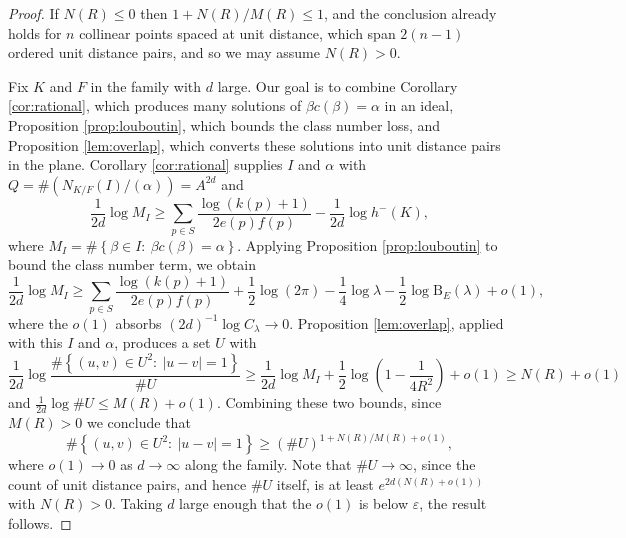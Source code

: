 \begin{proof}
If $N(R)\leq0$ then $1+N(R)/M(R)\leq1$, and the conclusion already holds for $n$ collinear points spaced at unit distance, which span $2(n-1)$ ordered unit distance pairs, and so we may assume $N(R)>0$.

Fix $K$ and $F$ in the family with $d$ large.  Our goal is to combine Corollary \ref{cor:rational}, which produces many solutions of $\beta c(\beta)=\alpha$ in an ideal, Proposition \ref{prop:louboutin}, which bounds the class number loss, and Proposition \ref{lem:overlap}, which converts these solutions into unit distance pairs in the plane.  Corollary \ref{cor:rational} supplies $I$ and $\alpha$ with $Q=\#(N_{K/F}(I)/(\alpha))=A^{2d}$ and
\[
   \frac1{2d}\log M_I
   \geq
   \sum_{p\in S}\frac{\log(k(p)+1)}{2e(p)f(p)}
   -\frac1{2d}\log h^-(K),
\]
where $M_I=\#\left\{\beta\in I :\ \beta c(\beta)=\alpha\right\}$.  Applying Proposition \ref{prop:louboutin} to bound the class number term, we obtain
\[
   \frac1{2d}\log M_I
   \geq
   \sum_{p\in S}\frac{\log(k(p)+1)}{2e(p)f(p)}
   +\frac12\log(2\pi)-\frac14\log\lambda-\frac12\log \mathrm{B}_E(\lambda)+o(1),
\]
where the $o(1)$ absorbs $(2d)^{-1}\log C_\lambda\to0$.  Proposition \ref{lem:overlap}, applied with this $I$ and $\alpha$, produces a set $U$ with
\[
   \frac1{2d}\log\frac{\#\left\{(u,v)\in U^2 :\ |u-v|=1\right\}}{\#U}
   \geq \frac1{2d}\log M_I+\frac12\log\left(1-\frac1{4R^2}\right)+o(1)
   \geq N(R)+o(1)
\]
and $\frac1{2d}\log\#U\leq M(R)+o(1)$.  Combining these two bounds, since $M(R)>0$ we conclude that
\[
   \#\left\{(u,v)\in U^2 :\ |u-v|=1\right\}\geq(\#U)^{1+N(R)/M(R)+o(1)},
\]
where $o(1)\to0$ as $d\to\infty$ along the family.  Note that $\#U\to\infty$, since the count of unit distance pairs, and hence $\#U$ itself, is at least $e^{2d(N(R)+o(1))}$ with $N(R)>0$.  Taking $d$ large enough that the $o(1)$ is below $\varepsilon$, the result follows.
\end{proof}
